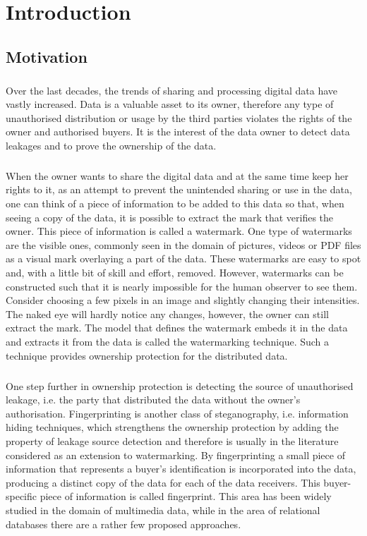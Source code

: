 
\chapter{Introduction}\label{sec:Introduction}

\section{Motivation}

\paragraph{}
Over the last decades, the trends of sharing and processing digital data have vastly increased. 
Data is a valuable asset to its owner, therefore any type of unauthorised distribution or usage by the third parties violates the rights of the owner and authorised buyers. It is the interest of the data owner to detect data leakages and to prove the ownership of the data.
\paragraph{} 
When the owner wants to share the digital data and at the same time keep her rights to it, as an attempt to prevent the unintended sharing or use in the data, one can think of a piece of information to be added to this data so that, when seeing a copy of the data, it is possible to extract the mark that verifies the owner. 
This piece of information is called a watermark.
One type of watermarks are the visible ones, commonly seen in the domain of pictures, videos or PDF files as a visual mark overlaying a part of the data. 
These watermarks are easy to spot and, with a little bit of skill and effort, removed. 
However, watermarks can be constructed such that it is nearly impossible for the human observer to see them.
Consider choosing a few pixels in an image and slightly changing their intensities. The naked eye will hardly notice any changes, however, the owner can still extract the mark.
The model that defines the watermark embeds it in the data and extracts it from the data is called the watermarking technique.
Such a technique provides ownership protection for the distributed data.
\paragraph{}
One step further in ownership protection is detecting the source of unauthorised leakage, i.e. the party that distributed the data without the owner’s authorisation.
Fingerprinting is another class of steganography, i.e. information hiding techniques, which strengthens the ownership protection by adding the property of leakage source detection and therefore is usually in the literature considered as an extension to watermarking.
By fingerprinting a small piece of information that represents a buyer's identification is incorporated into the data, producing a distinct copy of the data for each of the data receivers.
This buyer-specific piece of information is called fingerprint.
This area has been widely studied in the domain of multimedia data, while in the area of relational databases there are a rather few proposed approaches. 

